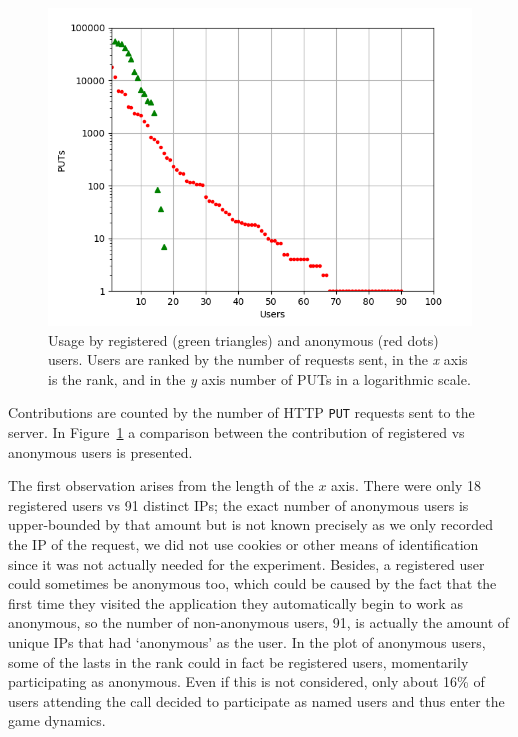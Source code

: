 \documentclass{llncs}
\begin{document}
\begin{figure}[h!tb]
    \centering
        \includegraphics[width=0.9\linewidth]{img/puts.png}

    \caption{Usage by registered (green triangles) and anonymous (red dots) users.  Users are ranked by
        the number of requests sent, in the \emph{x} axis is the rank, and in the \emph{y} axis
        number of PUTs in a logarithmic scale.}
      \label{fig:puts}
\end{figure}
%
Contributions are counted by the number of HTTP {\tt PUT} requests
sent to the server. %
In Figure~\ref{fig:puts} a comparison between the
contribution of registered vs anonymous users is presented.

The first observation arises from the length of the $x$ axis. There
were only 18 registered users vs 91 distinct IPs; the
exact number of anonymous users is upper-bounded by that amount but is
not known precisely as we only recorded the IP of the request, we did
not use cookies or other means of identification since it was not
actually needed for the experiment. Besides, a registered user
could sometimes be anonymous too, which could be caused by the fact that the first time they visited
the application they automatically begin to work as anonymous, so the
number of non-anonymous users, 91, is actually the amount of unique
IPs that had `anonymous' as the user. In the plot of
anonymous users, some of the lasts in the rank could in fact be registered users,
momentarily participating as anonymous. Even if this is not considered, only
about 16\% of users attending the call decided to participate as named
users and thus enter the game dynamics.
\end{document}
